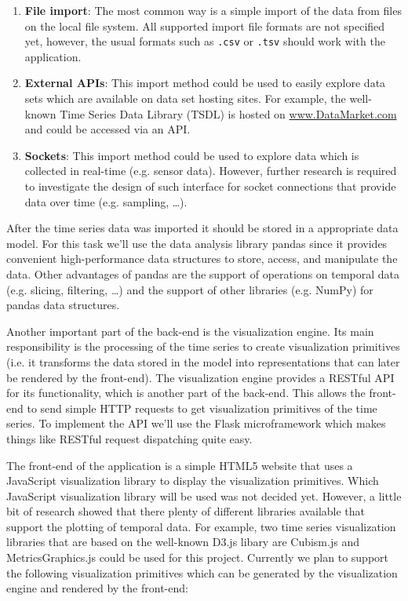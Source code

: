 \documentclass[12pt, a4paper]{article}
\begin{document}
\begin{enumerate}
 \item \textbf{File import}: The most common way is a simple import of the data from files on the local file system.
 All supported import file formats are not specified yet, however, the usual formats such as \texttt{.csv} or \texttt{.tsv} should work with the application.
 \item \textbf{External APIs}: This import method could be used to easily explore data sets which are available on data set hosting sites. 
 For example, the well-known Time Series Data Library (TSDL) is hosted on \url{www.DataMarket.com} and could be accessed via an API. 
 \item \textbf{Sockets}: This import method could be used to explore data which is collected in real-time (e.g. sensor data). 
 However, further research is required to investigate the design of such interface for socket connections that provide data over time (e.g. sampling, \ldots).
\end{enumerate}

After the time series data was imported it should be stored in a appropriate data model. 
For this task we'll use the data analysis library pandas since it provides convenient high-performance data structures to store, access, and manipulate the data.
Other advantages of pandas are the support of operations on temporal data (e.g. slicing, filtering, \ldots) and the support of other libraries (e.g. NumPy) for pandas data structures.

Another important part of the back-end is the visualization engine. 
Its main responsibility is the processing of the time series to create visualization primitives (i.e. it transforms the data stored in the model into representations that can later be rendered by the front-end).
The visualization engine provides a RESTful API for its functionality, which is another part of the back-end.
This allows the front-end to send simple HTTP requests to get visualization primitives of the time series.
To implement the API we'll use the Flask microframework which makes things like RESTful request dispatching quite easy.

The front-end of the application is a simple HTML5 website that uses a JavaScript visualization library to display the visualization primitives.
Which JavaScript visualization library will be used was not decided yet.
However, a little bit of research showed that there plenty of different libraries available that support the plotting of temporal data.
For example, two time series visualization libraries that are based on the well-known D3.js libary are Cubism.js and MetricsGraphics.js could be used for this project.
Currently we plan to support the following visualization primitives which can be generated by the visualization engine and rendered by the front-end:
\end{document}
